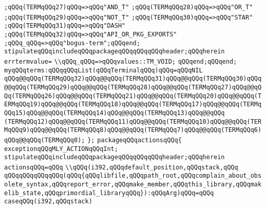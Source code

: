 \verb|;qQQq(TERMqQQq27)qQQq=>qQQq"AND_T"|\newline
\verb|;qQQq(TERMqQQq28)qQQq=>qQQq"OR_T"|\newline
\verb|;qQQq(TERMqQQq29)qQQq=>qQQq"NOT_T"|\newline
\verb|;qQQq(TERMqQQq30)qQQq=>qQQq"STAR"|\newline
\verb|;qQQq(TERMqQQq31)qQQq=>qQQq"DASH"|\newline
\verb|;qQQq(TERMqQQq32)qQQq=>qQQq"API_OR_PKG_EXPORTS"|\newline
\verb|;qQQq_qQQq=>qQQq"bogus-term";qQQqend;|\newline
\verb|stipulateqQQqincludeqQQqpackageqQQqqQQqqQQqheader;qQQqherein|\newline
\verb|errtermvalue=|\newline
\verb|\\qQQq_qQQq=>qQQqvalues::TM_VOID;|\newline
\verb|qQQqend;qQQqend;|\newline
\verb|myqQQqterms:qQQqqQQqList(qQQqTerminalqQQq)qQQq=qQQqNIL|\newline
\verb|qQQq@@qQQq(TERMqQQq32)qQQq@@qQQq(TERMqQQq31)qQQq@@qQQq(TERMqQQq30)qQQq@@qQQq(TERMqQQq29)qQQq@@qQQq(TERMqQQq28)qQQq@@qQQq(TERMqQQq27)qQQq@@qQQq(TERMqQQq26)qQQq@@qQQq(TERMqQQq21)qQQq@@qQQq(TERMqQQq20)qQQq@@qQQq(TERMqQQq19)qQQq@@qQQq(TERMqQQq18)qQQq@@qQQq(TERMqQQq17)qQQq@@qQQq(TERMqQQq15)qQQq@@qQQq(TERMqQQq14)qQQq@@qQQq(TERMqQQq13)qQQq@@qQQq|\newline
\verb|(TERMqQQq12)qQQq@@qQQq(TERMqQQq11)qQQq@@qQQq(TERMqQQq10)qQQq@@qQQq(TERMqQQq9)qQQq@@qQQq(TERMqQQq8)qQQq@@qQQq(TERMqQQq7)qQQq@@qQQq(TERMqQQq6)qQQq@@qQQq(TERMqQQq0);|\newline
\verb|};|\newline
\verb|packageqQQqactionsqQQq{|\newline
\verb|exceptionqQQqMLY_ACTIONqQQqInt;|\newline
\verb|stipulateqQQqincludeqQQqpackageqQQqqQQqqQQqheader;qQQqherein|\newline
\verb|actionsqQQq=qQQq|\newline
\verb|\\qQQq(i392,qQQqdefault_position,qQQqstack,qQQq|\newline
\verb|qQQqqQQqqQQqqQQq(qQQq{qQQqlibfile,qQQqpath_root,qQQqcomplain_about_obsolete_syntax,qQQqreport_error,qQQqmake_member,qQQqthis_library,qQQqmakelib_state,qQQqprimordial_libraryqQQq}):qQQqArg)qQQq=qQQq|\newline
\verb|caseqQQq(i392,qQQqstack)|\newline
